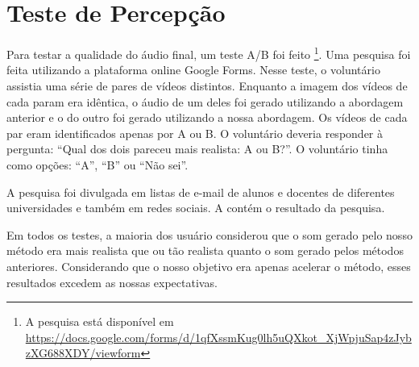 

\section{Teste de Percepção}

Para testar a qualidade do áudio final, um teste A/B foi feito \footnote{A pesquisa está disponível em \url{https://docs.google.com/forms/d/1qfXssmKug0lh5uQXkot_XjWpjuSap4zJybzXG688XDY/viewform}}. Uma pesquisa foi feita utilizando a plataforma online Google Forms\cite{googleforms}. Nesse teste, o voluntário assistia uma série de pares de vídeos distintos. Enquanto a imagem dos vídeos de cada param era idêntica, o áudio de um deles foi gerado utilizando a abordagem anterior e o do outro foi gerado utilizando a nossa abordagem. Os vídeos de cada par eram identificados apenas por A ou B. O voluntário deveria responder à pergunta: ``Qual dos dois pareceu mais realista: A ou B?''. O voluntário tinha como opções: ``A'', ``B'' ou ``Não sei''.

A pesquisa foi divulgada em listas de e-mail de alunos e docentes de diferentes universidades e também em redes sociais. A  contém o resultado da pesquisa.

Em todos os testes, a maioria dos usuário considerou que o som gerado pelo nosso método era mais realista que ou tão realista quanto o som gerado pelos métodos anteriores. Considerando que o nosso objetivo era apenas acelerar o método, esses resultados excedem as nossas expectativas.

